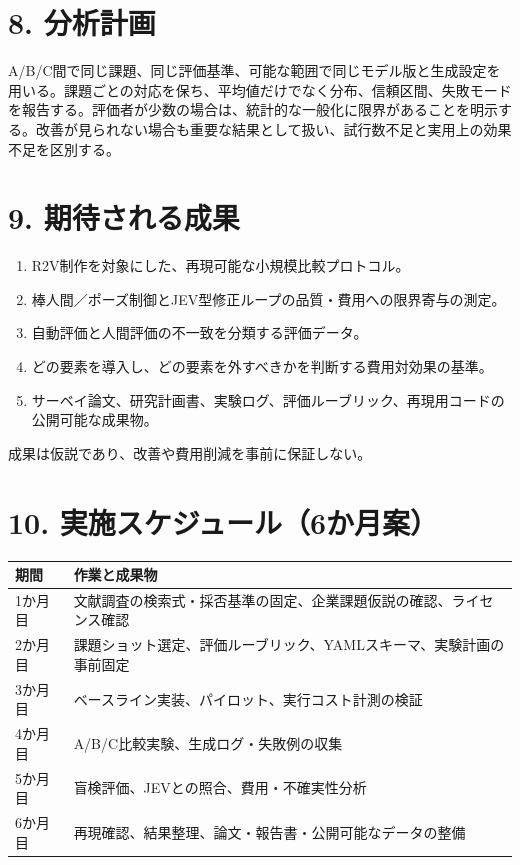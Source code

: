 \documentclass[11pt,a4paper]{article}
\begin{document}
\section*{8. 分析計画}
A/B/C間で同じ課題、同じ評価基準、可能な範囲で同じモデル版と生成設定を用いる。課題ごとの対応を保ち、平均値だけでなく分布、信頼区間、失敗モードを報告する。評価者が少数の場合は、統計的な一般化に限界があることを明示する。改善が見られない場合も重要な結果として扱い、試行数不足と実用上の効果不足を区別する。

\section*{9. 期待される成果}
\begin{enumerate}[nosep]
\item R2V制作を対象にした、再現可能な小規模比較プロトコル。
\item 棒人間／ポーズ制御とJEV型修正ループの品質・費用への限界寄与の測定。
\item 自動評価と人間評価の不一致を分類する評価データ。
\item どの要素を導入し、どの要素を外すべきかを判断する費用対効果の基準。
\item サーベイ論文、研究計画書、実験ログ、評価ルーブリック、再現用コードの公開可能な成果物。
\end{enumerate}
成果は仮説であり、改善や費用削減を事前に保証しない。

\section*{10. 実施スケジュール（6か月案）}
\begin{center}
\begin{tabularx}{\linewidth}{p{18mm}X}
\toprule
期間 & 作業と成果物 \\
\midrule
1か月目 & 文献調査の検索式・採否基準の固定、企業課題仮説の確認、ライセンス確認 \\
2か月目 & 課題ショット選定、評価ルーブリック、YAMLスキーマ、実験計画の事前固定 \\
3か月目 & ベースライン実装、パイロット、実行コスト計測の検証 \\
4か月目 & A/B/C比較実験、生成ログ・失敗例の収集 \\
5か月目 & 盲検評価、JEVとの照合、費用・不確実性分析 \\
6か月目 & 再現確認、結果整理、論文・報告書・公開可能なデータの整備 \\
\bottomrule
\end{tabularx}
\end{center}
\end{document}
